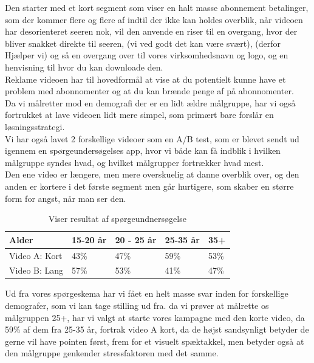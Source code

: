 Den starter med et kort segment som viser en halt masse abonnement betalinger, som der kommer flere og flere af indtil der ikke kan holdes overblik, når videoen har desorienteret seeren nok, vil den anvende en riser til en overgang, hvor der bliver snakket direkte til seeren, (vi ved godt det kan være svært), (derfor Hjælper vi) og så en overgang over til vores virksomhedsnavn og logo, og en henvisning til hvor du kan downloade den.\\

Reklame videoen har til hovedformål at vise at du potentielt kunne have et problem med abonnomenter og at du kan brænde penge af på abonnomenter.\\

Da vi målretter mod en demografi der er en lidt ældre målgruppe, har vi også fortrukket at lave videoen lidt mere simpel, som primært bare forslår en løsningsstrategi.\\

Vi har også lavet 2 forskellige videoer som en A/B test, som er blevet sendt ud igennem en spørgeundersøgelses app, hvor vi både kan få indblik i hvilken målgruppe syndes hvad, og hvilket målgrupper fortrækker hvad mest.\\

Den ene video er længere, men mere overskuelig at danne overblik over, og den anden er kortere i det første segment men går hurtigere, som skaber en større form for angst, når man ser den. 

\begin{table}[H]
    \centering
    \begin{tabular}{|l|l|l|l|l|}
        \hline
        Alder          & 15-20 år & 20 - 25 år & 25-35 år & 35+ \\ \hline
        Video A: Kort  & 43\% & 47\% & 59\% & 53\% \\ \hline
        Video B: Lang  & 57\% & 53\% & 41\% & 47\% \\ \hline
    \end{tabular}    
    \caption{Viser resultat af spørgeundnersøgelse}
\end{table}

Ud fra vores spørgeskema har vi fået en helt masse svar inden for forskellige demografer, som vi kan tage stilling ud fra. da vi prøver at målrette os målgruppen 25+, har vi valgt at starte vores kampagne med den korte video, da 59\% af dem fra 25-35 år, fortrak video A kort, da de højst sandsynligt betyder de gerne vil have pointen først, frem for et visuelt spæktakkel, men betyder også at den målgruppe genkender stressfaktoren med det samme.

